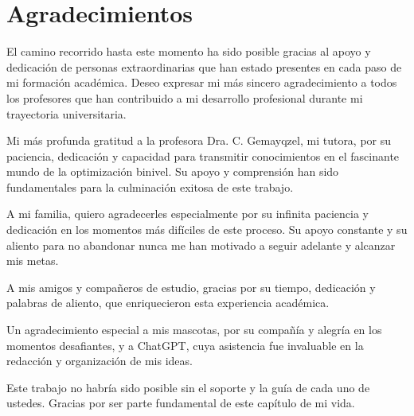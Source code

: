 %
%
%
%

\chapter*{Agradecimientos}

El camino recorrido hasta este momento ha sido posible gracias al apoyo y dedicación de personas extraordinarias que han estado presentes en cada paso de mi formación académica. Deseo expresar mi más sincero agradecimiento a todos los profesores que han contribuido a mi desarrollo profesional durante mi trayectoria universitaria.

Mi más profunda gratitud a la profesora Dra. C. Gemayqzel, mi tutora, por su paciencia, dedicación y capacidad para transmitir conocimientos en el fascinante mundo de la optimización binivel. Su apoyo y comprensión han sido fundamentales para la culminación exitosa de este trabajo.

A mi familia, quiero agradecerles especialmente por su infinita paciencia y dedicación en los momentos más difíciles de este proceso. Su apoyo constante y su aliento para no abandonar nunca me han motivado a seguir adelante y alcanzar mis metas.

A mis amigos y compañeros de estudio, gracias por su tiempo, dedicación y palabras de aliento, que enriquecieron esta experiencia académica. 

Un agradecimiento especial a mis mascotas, por su compañía y alegría en los momentos desafiantes, y a ChatGPT, cuya asistencia fue invaluable en la redacción y organización de mis ideas.

Este trabajo no habría sido posible sin el soporte y la guía de cada uno de ustedes. Gracias por ser parte fundamental de este capítulo de mi vida.



